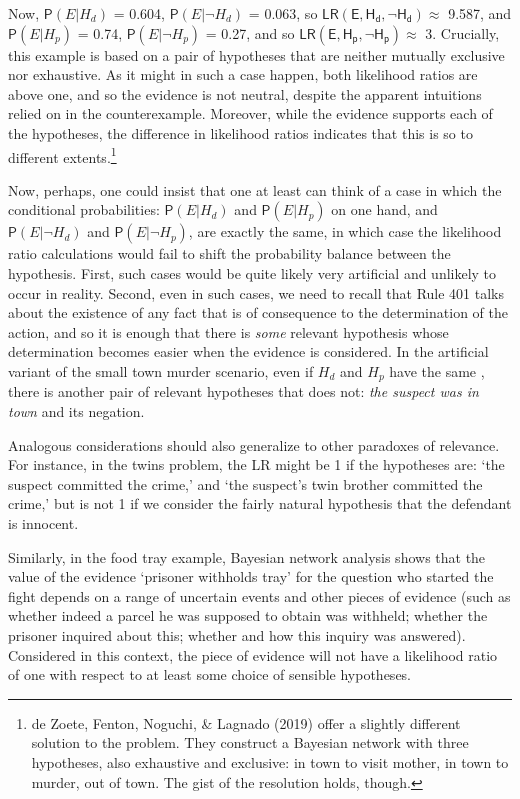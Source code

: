 \documentclass[
  10pt,
  dvipsnames,enabledeprecatedfontcommands]{scrartcl}
\newcommand{\mar}[1]{\todo[color=blue!40]{#1}}
\newcommand{\n}{\neg}
\newcommand{\pr}[1]{\mathsf{P}(#1)}
\begin{document}
Now, \(\pr{E\vert H_d}\) = 0.604, \(\pr{E \vert \n H_d}\) = 0.063, so
\(\mathsf{LR(E, H_d, \n H_d)}\approx\) 9.587, and \(\pr{E\vert H_p}\) =
0.74, \(\pr{E \vert \n H_p}\) = 0.27, and so
\(\mathsf{LR(E, H_p, \n H_p)} \approx\) 3. Crucially, this example is
based on a pair of hypotheses that are neither mutually exclusive nor
exhaustive. As it might in such a case happen, both likelihood ratios
are above one, and so the evidence is not neutral, despite the apparent
intuitions relied on in the counterexample. Moreover, while the evidence
supports each of the hypotheses, the difference in likelihood ratios
indicates that this is so to different extents.\footnote{ de Zoete,
  Fenton, Noguchi, \& Lagnado (2019) offer a slightly different solution
  to the problem. They construct a Bayesian network with three
  hypotheses, also exhaustive and exclusive: in town to visit mother, in
  town to murder, out of town. The gist of the resolution holds, though.}

\mar{R: added this passage in light of Sophie's comments.}

Now, perhaps, one could insist that one at least can think of a case in
which the conditional probabilities: \(\pr{E\vert H_d}\) and
\(\pr{E \vert H_p}\) on one hand, and \(\pr{E\vert \n H_d}\) and
\(\pr{E \vert \n H_p}\), are exactly the same, in which case the
likelihood ratio calculations would fail to shift the probability
balance between the hypothesis. First, such cases would be quite likely
very artificial and unlikely to occur in reality. Second, even in such
cases, we need to recall that Rule 401 talks about the existence of any
fact that is of consequence to the determination of the action, and so
it is enough that there is \emph{some} relevant hypothesis whose
determination becomes easier when the evidence is considered. In the
artificial variant of the small town murder scenario, even if \(H_d\)
and \(H_p\) have the same , there is another pair of relevant
hypotheses that does not: \emph{the suspect was in town} and its
negation.

Analogous considerations should also generalize to other paradoxes of
relevance. For instance, in the twins problem, the LR might be 1 if the
hypotheses are: `the suspect committed the crime,' and `the suspect's
twin brother committed the crime,' but is not 1 if we consider the
fairly natural hypothesis that the defendant is innocent.

Similarly, in the food tray example, Bayesian network analysis shows
that the value of the evidence `prisoner withholds tray' for the
question who started the fight depends on a range of uncertain events
and other pieces of evidence (such as whether indeed a parcel he was
supposed to obtain was withheld; whether the prisoner inquired about
this; whether and how this inquiry was answered). Considered in this
context, the piece of evidence will not have a likelihood ratio of one
with respect to at least some choice of sensible hypotheses.
\end{document}

